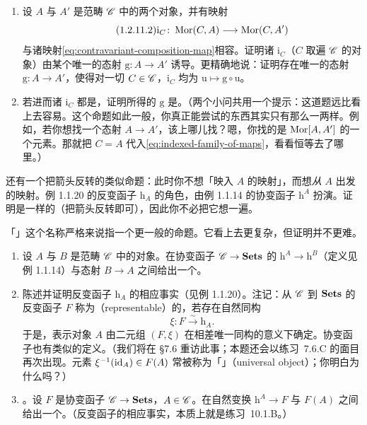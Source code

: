 \begin{exercise}\label{ex:yoneda-lemma-simple-version}
\begin{enumerate}[label=(\alph*)]
\item 设 $A$ 与 $A'$ 是范畴 $\mathscr{C}$ 中的两个对象，并有映射
\begin{equation*}\tag{1.2.11.2}\label{eq:indexed-family-of-maps}
\mathrm{i}_C\colon\operatorname{Mor}(C,A)\longrightarrow\operatorname{Mor}(C,A')
\end{equation*}
与诸映射\eqref{eq:contravariant-composition-map}相容。证明诸 $\mathrm{i}_C$（$C$ 取遍 $\mathscr{C}$ 的对象）由某个唯一的态射 $\mathrm{g}\colon A\to A'$ 诱导。更精确地说：证明存在唯一的态射 $\mathrm{g}\colon A\to A'$，使得对一切 $C\in\mathscr{C}$，$\mathrm{i}_C$ 均为 $\mathrm{u}\mapsto\mathrm{g}\circ\mathrm{u}$。
\item 若进而诸 $\mathrm{i}_C$ 都是\trBijection，证明所得的 $\mathrm{g}$ 是\trIsomorphism。（两个小问共用一个提示：这道题远比看上去容易。这个命题如此一般，你真正能尝试的东西其实只有那么一两样。例如，若你想找一个态射 $A\to A'$，该上哪儿找？嗯，你找的是 $\operatorname{Mor}[A,A']$ 的一个元素。那就把 $C=A$ 代入\eqref{eq:indexed-family-of-maps}，看看恒等去了哪里。）
\end{enumerate}
\end{exercise}

还有一个把箭头反转的类似命题：此时你不想「映入 $A$ 的映射」，而想\emph{从} $A$ 出发的映射。例 1.1.20 的反变函子 $\mathrm{h}_A$ 的角色，由例 1.1.14 的协变函子 $\mathrm{h}^A$ 扮演。证明是一样的（把箭头反转即可），因此你不必把它想一遍。

「\trYonedaLemma」这个名称严格来说指一个更一般的命题。它看上去更复杂，但证明并不更难。

\begin{exercise}[\hard]\label{ex:general-yoneda-representables}
\begin{enumerate}[label=(\alph*)]
\item 设 $A$ 与 $B$ 是范畴 $\mathscr{C}$ 中的对象。在协变函子 $\mathscr{C}\to\mathbf{Sets}$ 的\trNaturalTransformation{} $\mathrm{h}^A\to\mathrm{h}^B$（定义见例 1.1.14）与态射 $B\to A$ 之间给出一个\trBijection。
\item 陈述并证明反变函子 $\mathrm{h}_A$ 的相应事实（见例 1.1.20）。注记：从 $\mathscr{C}$ 到 $\mathbf{Sets}$ 的反变函子 $F$ 称为\textbf{\trRepresentable}（representable）的，若存在自然同构
\[
\xi\colon F\mathrel{\xrightarrow{\ \sim\ }}\mathrm{h}_A.
\]
于是，表示对象 $A$ 由二元组 $(F,\xi)$ 在相差唯一同构的意义下确定。协变函子也有类似的定义。（我们将在 \S7.6 重访此事；本题还会以练习~7.6.C 的面目再次出现。元素 $\xi^{-1}(\mathrm{id}_A)\in F(A)$ 常被称为「\trUniversalObject{}」（universal object）；你明白为什么吗？）
\item \trYonedaLemma。设 $F$ 是协变函子 $\mathscr{C}\to\mathbf{Sets}$，$A\in\mathscr{C}$。在自然变换 $\mathrm{h}^A\to F$ 与 $F(A)$ 之间给出一个\trBijection{}。（反变函子的相应事实，本质上就是练习~10.1.B。）
\end{enumerate}
\end{exercise}

